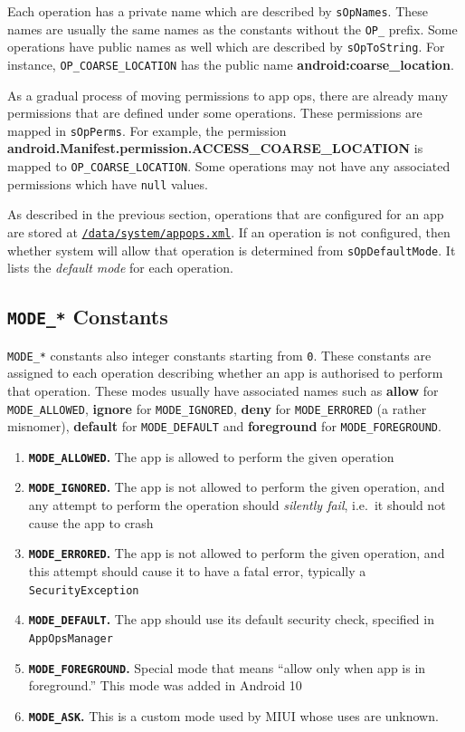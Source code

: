 Each operation has a private name which are described by \texttt{sOpNames}.
These names are usually the same names as the constants without the \texttt{OP\_} prefix.
Some operations have public names as well which are described by \texttt{sOpToString}.
For instance, \texttt{OP\_COARSE\_LOCATION} has the public name \textbf{android:coarse\_location}.

As a gradual process of moving permissions to app ops, there are already many permissions that are defined under some operations.
These permissions are mapped in \texttt{sOpPerms}.
For example, the permission \textbf{android.Manifest.permission.ACCESS\_COARSE\_LOCATION} is mapped to
\texttt{OP\_COARSE\_LOCATION}. Some operations may not have any associated permissions which have \texttt{null} values.

As described in the previous section, operations that are configured for an app are stored at
\hyperref[sec:appops-xml]{\texttt{/data/system/appops.xml}}.
If an operation is not configured, then whether system will allow that operation is determined from \texttt{sOpDefaultMode}.
It lists the \textit{default mode} for each operation.

\subsection{\texttt{MODE\_*} Constants}\label{subsec:mode-constants} %
\texttt{MODE\_*} constants also integer constants starting from \texttt{0}. These constants are assigned to each
operation describing whether an app is authorised to perform that operation. These modes usually have associated names
such as \textbf{allow} for \texttt{MODE\_ALLOWED}, \textbf{ignore} for \texttt{MODE\_IGNORED}, \textbf{deny} for
\texttt{MODE\_ERRORED} (a rather misnomer), \textbf{default} for \texttt{MODE\_DEFAULT} and \textbf{foreground}
for \texttt{MODE\_FOREGROUND}.

\begin{enumerate}\addtocounter{enumi}{-1}
    \item \textbf{\texttt{MODE\_ALLOWED}.} The app is allowed to perform the given operation
    \item \textbf{\texttt{MODE\_IGNORED}.} The app is not allowed to perform the given operation, and any attempt to
    perform the operation should \emph{silently fail}, i.e.\ it should not cause the app to crash
    \item \textbf{\texttt{MODE\_ERRORED}.} The app is not allowed to perform the given operation, and this attempt
    should cause it to have a fatal error, typically a \texttt{SecurityException}
    \item \textbf{\texttt{MODE\_DEFAULT}.} The app should use its default security check, specified in \texttt{AppOpsManager}
    \item \textbf{\texttt{MODE\_FOREGROUND}.} Special mode that means ``allow only when app is in foreground.''
    This mode was added in Android 10
    \item \textbf{\texttt{MODE\_ASK}.} This is a custom mode used by MIUI whose uses are unknown.
\end{enumerate}

